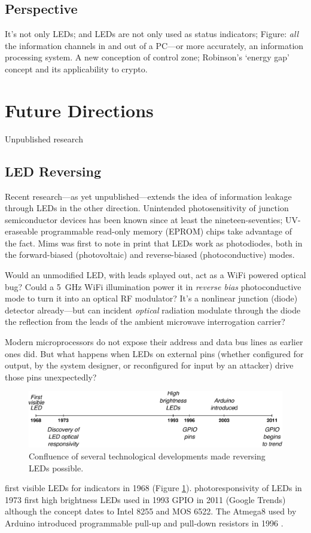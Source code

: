 \documentclass[a4paper,twoside]{book}
\begin{document}
\subsection{Perspective}
It's not only LEDs; and LEDs are not only used as status indicators; Figure:
\emph{all} the information channels in and out of a PC---or more accurately,
an information processing system. A new conception of control zone;
Robinson's `energy gap' concept and its applicability to crypto.
\section{Future Directions}
Unpublished research
\subsection{LED Reversing}
Recent research---as yet unpublished---extends the idea of information leakage
through LEDs in the other direction. Unintended photosensitivity of junction
semiconductor devices has been known since at least the nineteen-seventies;
UV-eraseable programmable read-only memory (EPROM) chips take advantage of the
fact. Mims \citeyear{Mims1973b} was first to note in print that LEDs work as
photodiodes, both in the forward-biased (photovoltaic) and reverse-biased
(photoconductive) modes.

Would an unmodified LED, with leads splayed out, act as a WiFi powered
optical bug? Could a \SI{5}{\giga\hertz} WiFi illumination power it in
\emph{reverse bias} photoconductive mode to turn it into an optical RF
modulator? It's a nonlinear junction (diode) detector already---but can
incident \emph{optical} radiation modulate through the diode the reflection
from the leads of the ambient microwave interrogation carrier?

Modern microprocessors do not expose their address and data bus lines as
earlier ones did. But what happens when LEDs on external pins (whether
configured for output, by the system designer, or reconfigured for input by an
attacker) drive those pins unexpectedly?
\begin{figure}[ht]
  \centering
  \includegraphics[width=\textwidth]{timeline.pdf}
  \caption{Confluence of several technological developments made reversing LEDs
    possible.}
  \label{figure:timeline}
\end{figure}
first visible LEDs for indicators in 1968 (Figure \ref{figure:timeline}).
photoresponsivity of LEDs in 1973
first high brightness LEDs used in 1993
GPIO in 2011 (Google Trends) although the concept dates to Intel 8255 and MOS
6522. The Atmega8 used by Arduino introduced programmable pull-up and pull-down
resistors in 1996 \cite{Mims1973b,Atmel2013,Stringfellow1997}.
\end{document}
